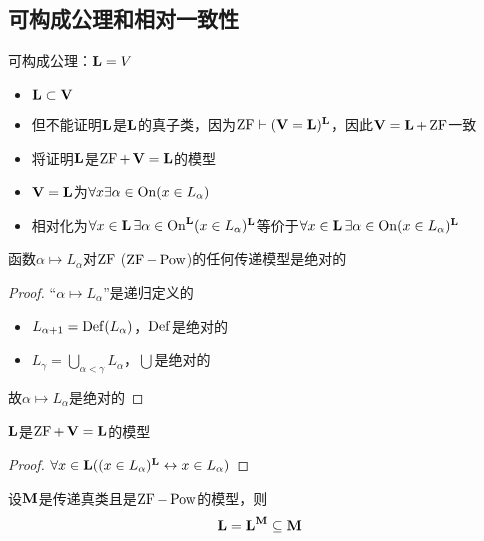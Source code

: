\documentclass[11pt]{article}
\begin{document}
\subsection{可构成公理和相对一致性}
\label{sec:org0222d25}
可构成公理：\(\bL=V\)

\begin{remark}
\begin{itemize}
\item \(\bL\subset\bV\)
\item 但不能证明\(\bL\)是\(\bL\)的真子类，因为\(\ZF\vdash(\bV=\bL)^{\bL}\)，因此\(\bV=\bL+\ZF\)一致
\item 将证明\(\bL\)是\(\ZF+\bV=\bL\)的模型
\item \(\bV=\bL\)为\(\forall x\exists\alpha\in\On(x\in L_\alpha)\)
\item 相对化为\(\forall x\in\bL\exists\alpha\in\On^{\bL}(x\in L_\alpha)^{\bL}\)等价于\(\forall x\in\bL\exists\alpha\in\On(x\in L_\alpha)^{\bL}\)
\end{itemize}
\end{remark}

\begin{lemma}[]
函数\(\alpha\mapsto L_\alpha\)对\(\ZF\) (\(\ZF-\Pow\))的任何传递模型是绝对的
\end{lemma}

\begin{proof}
``\(\alpha\mapsto L_\alpha\)''是递归定义的
\begin{itemize}
\item \(L_{\alpha+1}=\Def(L_{\alpha})\)，\(\Def\)是绝对的
\item \(L_\gamma=\bigcup_{\alpha<\gamma}L_\alpha\)，\(\bigcup\)是绝对的
\end{itemize}


故\(\alpha\mapsto L_\alpha\)是绝对的
\end{proof}

\begin{theorem}[]
\(\bL\)是\(\ZF+\bV=\bL\)的模型
\end{theorem}

\begin{proof}
\(\forall x\in\bL((x\in L_\alpha)^{\bL}\leftrightarrow x\in L_\alpha)\)
\end{proof}

\begin{theorem}[]
设\(\bM\)是传递真类且是\(\ZF-\Pow\)的模型，则
\begin{equation*}
\bL=\bL^{\bM}\subseteq\bM
\end{equation*}
\end{theorem}
\end{document}

